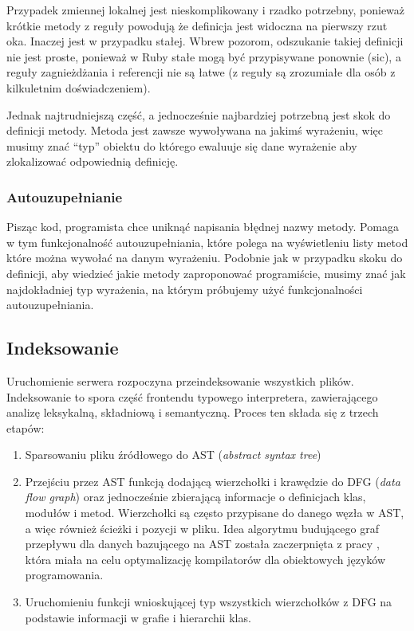 \documentclass[shortabstract,mgr]{iithesis}
\begin{document}
Przypadek zmiennej lokalnej jest nieskomplikowany i rzadko potrzebny, ponieważ krótkie metody z reguły powodują że definicja jest widoczna na pierwszy rzut oka. Inaczej jest w przypadku stałej. Wbrew pozorom, odszukanie takiej definicji nie jest proste, ponieważ w Ruby stałe mogą być przypisywane ponownie (sic), a reguły zagnieżdżania i referencji nie są łatwe (z reguły są zrozumiałe dla osób z kilkuletnim doświadczeniem).

Jednak najtrudniejszą część, a jednocześnie najbardziej potrzebną jest skok do definicji metody. Metoda jest zawsze wywoływana na jakimś wyrażeniu, więc musimy znać \enquote{typ} obiektu do którego ewaluuje się dane wyrażenie aby zlokalizować odpowiednią definicję.

\subsubsection{Autouzupełnianie}

Pisząc kod, programista chce uniknąć napisania błędnej nazwy metody. Pomaga w tym funkcjonalność autouzupełniania, które polega na wyświetleniu listy metod które można wywołać na danym wyrażeniu. Podobnie jak w przypadku skoku do definicji, aby wiedzieć jakie metody zaproponować programiście, musimy znać jak najdokładniej typ wyrażenia, na którym próbujemy użyć funkcjonalności autouzupełniania.

\subsection{Indeksowanie}

Uruchomienie serwera rozpoczyna przeindeksowanie wszystkich plików. Indeksowanie to spora część frontendu typowego interpretera, zawierającego analizę leksykalną, składniową i semantyczną. Proces ten składa się z trzech etapów:
\begin{enumerate}
\item Sparsowaniu pliku źródłowego do AST (\textit{abstract syntax tree})
\item Przejściu przez AST funkcją dodającą wierzchołki i krawędzie do DFG (\textit{data flow graph}) oraz jednocześnie zbierającą informacje o definicjach klas, modułów i metod. Wierzchołki są często przypisane do danego węzła w AST, a więc również ścieżki i pozycji w pliku. Idea algorytmu budującego graf przepływu dla danych bazującego na AST została zaczerpnięta z pracy \citet*{FICA}, która miała na celu optymalizację kompilatorów dla obiektowych języków programowania.
\item Uruchomieniu funkcji wnioskującej typ wszystkich wierzchołków z DFG na podstawie informacji w grafie i hierarchii klas.
\end{enumerate}
\end{document}
